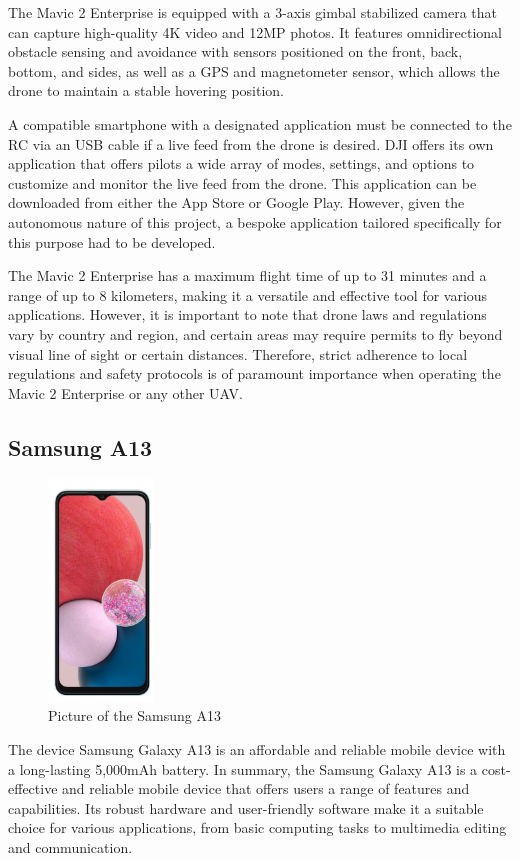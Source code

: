 The Mavic 2 Enterprise is equipped with a 3-axis gimbal stabilized camera that can capture high-quality 4K video and 12MP photos. It features omnidirectional obstacle sensing and avoidance with sensors positioned on the front, back, bottom, and sides, as well as a GPS and magnetometer sensor, which allows the drone to maintain a stable hovering position.

A compatible smartphone with a designated application must be connected to the RC via an USB cable if a live feed from the drone is desired. DJI offers its own application that offers pilots a wide array of modes, settings, and options to customize and monitor the live feed from the drone. This application can be downloaded from either the App Store or Google Play. However, given the autonomous nature of this project, a bespoke application tailored specifically for this purpose had to be developed.

The Mavic 2 Enterprise has a maximum flight time of up to 31 minutes and a range of up to 8 kilometers, making it a versatile and effective tool for various applications. However, it is important to note that drone laws and regulations vary by country and region, and certain areas may require permits to fly beyond visual line of sight or certain distances. Therefore, strict adherence to local regulations and safety protocols is of paramount importance when operating the Mavic 2 Enterprise or any other UAV.



\subsection{Samsung A13}
\begin{figure}[h!]
\centering
 \includegraphics[width=0.25\textwidth,angle =90]{figure/Samsung_A13.png}
\caption{Picture of the Samsung A13}
\end{figure}
The device Samsung Galaxy A13 is an affordable and reliable mobile device with a long-lasting 5,000mAh battery.
In summary, the Samsung Galaxy A13 is a cost-effective and reliable mobile device that offers users a range of features and capabilities. Its robust hardware and user-friendly software make it a suitable choice for various applications, from basic computing tasks to multimedia editing and communication.



